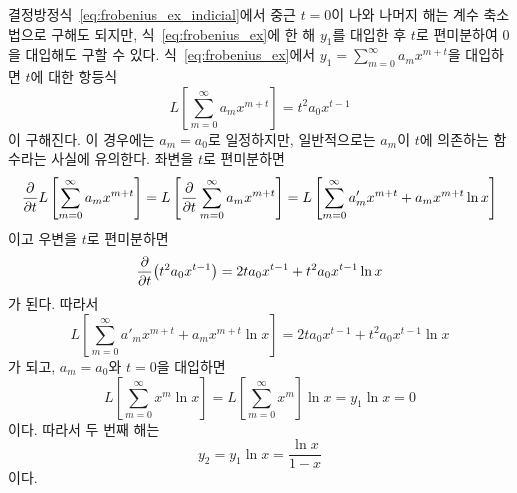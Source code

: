 \documentclass[../engineering_mathematics_lecture_note.tex]{subfiles}
\begin{document}
\begin{example}
    결정방정식~\ref{eq:frobenius_ex_indicial}에서 중근 $t = 0$이 나와 나머지 해는 계수 축소법으로 구해도 되지만, 식~\ref{eq:frobenius_ex}에 한 해 $y_1$를 대입한 후 $t$로 편미분하여 0을 대입해도 구할 수 있다.
    식~\ref{eq:frobenius_ex}에서 $y_1 = \sum^{\infty}_{m = 0} a_m x^{m + t}$을 대입하면 $t$에 대한 항등식
    \begin{equation*}
        L \left[ \sum^{\infty}_{m = 0} a_m x^{m + t} \right] = t^2 a_0 x^{t - 1}
    \end{equation*}
    이 구해진다.
    이 경우에는 $a_m = a_0$로 일정하지만, 일반적으로는 $a_m$이 $t$에 의존하는 함수라는 사실에 유의한다.
    좌변을 $t$로 편미분하면
    \begin{equation*}
        \pdv{t} L \left[ \sum^{\infty}_{m = 0} a_m x^{m + t} \right] = L \left[ \pdv{t} \sum^{\infty}_{m = 0} a_m x^{m + t} \right] = L \left[ \sum^{\infty}_{m = 0} a'_m x^{m + t} + a_m x^{m + t} \ln x \right]
    \end{equation*}
    이고 우변을 $t$로 편미분하면
    \begin{equation*}
        \pdv{t} (t^2 a_0 x^{t - 1}) = 2t a_0 x^{t - 1} + t^2 a_0 x^{t - 1} \ln x
    \end{equation*}
    가 된다.
    따라서
    \begin{equation*}
        L \left[ \sum^{\infty}_{m = 0} a'_m x^{m + t} + a_m x^{m + t} \ln x \right] = 2t a_0 x^{t - 1} + t^2 a_0 x^{t - 1} \ln x
    \end{equation*}
    가 되고, $a_m = a_0$와 $t = 0$을 대입하면
    \begin{equation*}
        L\left[ \sum^{\infty}_{m = 0} x^m \ln x \right] = L\left[ \sum^{\infty}_{m = 0} x^m \right]\ln x = y_1 \ln x = 0
    \end{equation*}
    이다.
    따라서 두 번째 해는
    \begin{equation*}
        y_2 = y_1 \ln x = \frac{\ln x}{1 - x} 
    \end{equation*}
    이다.
\end{example}
\end{document}

